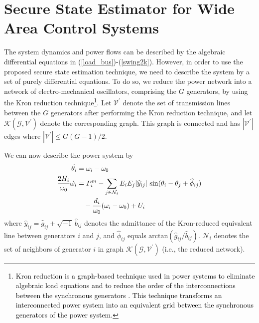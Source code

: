 \section{Secure State Estimator for Wide Area Control Systems}\label{sec:application1}
The system dynamics and power flows can be described by the algebraic differential equations in (\ref{load_bus})-(\ref{swing2k}). However, in order to use the proposed secure state estimation technique, we need to describe the system by a set of purely differential equations. To do so, we reduce the power network into a network of electro-mechanical oscillators, comprising the $G$ generators, by using the Kron reduction technique\footnote{\textcolor{black}{Kron reduction is a graph-based technique  used in power systems to eliminate algebraic load equations and to reduce the order of the interconnections between the synchronous generators \cite{kron}. This technique transforms an interconnected power system into an equivalent grid between the synchronous generators of the power system.}}. Let $\mathcal{V}^\prime$ denote the set of transmission lines between the $G$ generators after performing the Kron reduction technique, and let $\mathcal{K}(\mathcal{G},\mathcal{V}^\prime)$ denote the corresponding graph. This graph is connected and has $|\mathcal{V}^\prime|$ edges where $|\mathcal{V}^\prime| \le G (G-1)/2$.






We can now describe the power system by
\begin{equation}\label{eq:kron}
\begin{aligned}
\dot{\theta_i} & =\omega_i-\omega_0\\
\frac{2H_i}{\omega_0} \dot{\omega_i} &=P_i^m-\sum_{j\in\mathcal{N}_i}{{E_i E_j {|\widehat{y}_{ij}|} ~ \text{sin}(\theta_i-\theta_j+\widehat{\phi}_{ij})}}\\
&\quad-\textcolor{black}{\frac{d_i}{\omega_0} (\omega_i-\omega_0)}+ U_i
\end{aligned}
\end{equation}
where $\widehat{y}_{ij}=\widehat{g}_{ij}+\sqrt{-1} ~\widehat{b}_{ij}$ denotes the admittance of the Kron-reduced equivalent line between generators $i$ and $j$, and $\widehat{\phi}_{ij}$ equals $\text{arctan}(\widehat{g}_{ij}/\widehat{b}_{ij})$. $\mathcal{N}_i$ denotes the set of neighbors of generator $i$ in graph $\mathcal{K}(\mathcal{G},\mathcal{V}^\prime)$ (i.e., the reduced network).

